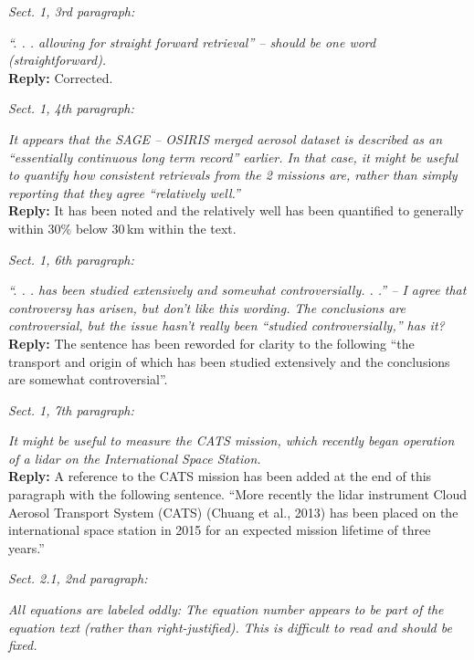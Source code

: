 \documentclass[12pt, notitlepage]{article}
\begin{document}
\textit{Sect. 1, 3rd paragraph:}

\textit{``. . . allowing for straight forward retrieval'' – should be one word (straightforward).}\\

\textbf{Reply:} Corrected.

\hrulefill

\textit{Sect. 1, 4th paragraph:}

\textit{It appears that the SAGE – OSIRIS merged aerosol dataset is described as an ``essentially
continuous long term record'' earlier. In that case, it might be useful to quantify
how consistent retrievals from the 2 missions are, rather than simply reporting that they
agree ``relatively well.''}\\

\textbf{Reply:} It has been noted and the relatively well has been quantified to generally within 30\% below 30\,km within the text.

\hrulefill

\textit{Sect. 1, 6th paragraph:}

\textit{``. . . has been studied extensively and somewhat controversially. . .'' – I agree that controversy
has arisen, but don't like this wording. The conclusions are controversial, but
the issue hasn't really been ``studied controversially,'' has it?}\\

\textbf{Reply:} The sentence has been reworded for clarity to the following ``the transport and origin of which has been
studied extensively and the conclusions are somewhat controversial''.

\hrulefill

\textit{Sect. 1, 7th paragraph:}

\textit{It might be useful to measure the CATS mission, which recently began operation of a
lidar on the International Space Station.}\\

\textbf{Reply:} A reference to the CATS mission has been added at the end of this paragraph with the following sentence. ``More recently the lidar instrument Cloud Aerosol Transport System (CATS) (Chuang et al., 2013) has been placed on the international space station in 2015 for an expected mission lifetime of three years.''

\hrulefill

\textit{Sect. 2.1, 2nd paragraph:}

\textit{All equations are labeled oddly: The equation number appears to be part of the equation
text (rather than right-justified). This is difficult to read and should be fixed.}\\
\end{document}
